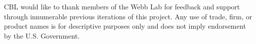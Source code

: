 \documentclass[10pt,letterpaper]{article}
\begin{document}
CBL would like to thank members of the Webb Lab for feedback and support through innumerable previous iterations of this project.
Any use of trade, firm, or product names is for descriptive purposes only and does not imply endorsement by the U.S. Government.

\nolinenumbers

%
%
% 

%
%
\end{document}
